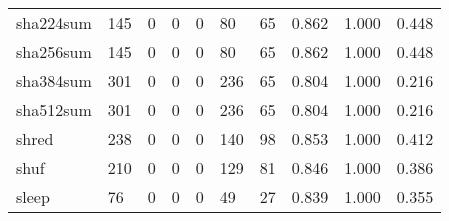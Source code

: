 \begin{longtable}{lp{2.0cm}p{2.0cm}p{2.0cm}p{2.0cm}p{2.0cm}p{2.0cm}p{2.0cm}p{2.0cm}p{2.0cm}}
sha224sum &                    145 &                                             0 &                                            0 &                                           0 &                                           80 &                                         65 &                                0.862 &                                  1.000 &                                0.448 \\
sha256sum &                    145 &                                             0 &                                            0 &                                           0 &                                           80 &                                         65 &                                0.862 &                                  1.000 &                                0.448 \\
sha384sum &                    301 &                                             0 &                                            0 &                                           0 &                                          236 &                                         65 &                                0.804 &                                  1.000 &                                0.216 \\
sha512sum &                    301 &                                             0 &                                            0 &                                           0 &                                          236 &                                         65 &                                0.804 &                                  1.000 &                                0.216 \\
shred     &                    238 &                                             0 &                                            0 &                                           0 &                                          140 &                                         98 &                                0.853 &                                  1.000 &                                0.412 \\
shuf      &                    210 &                                             0 &                                            0 &                                           0 &                                          129 &                                         81 &                                0.846 &                                  1.000 &                                0.386 \\
sleep     &                     76 &                                             0 &                                            0 &                                           0 &                                           49 &                                         27 &                                0.839 &                                  1.000 &                                0.355 \\

\end{longtable}
